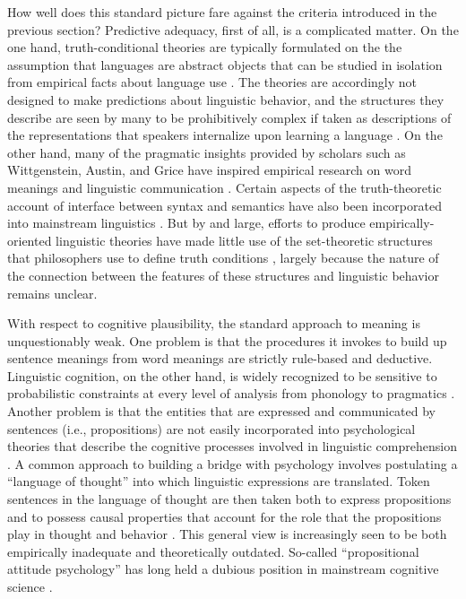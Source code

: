 How well does this standard picture fare against the criteria introduced in the previous section? Predictive adequacy, first of all, is a complicated matter. On the one hand, truth-conditional theories are typically formulated on the the assumption that languages are abstract objects that can be studied in isolation from empirical facts about language use \citep{Lewis:1970, Jackendoff:2002, Speaks:2014}. The theories are accordingly not designed to make predictions about linguistic behavior, and the structures they describe are seen by many to be prohibitively complex if taken as descriptions of the representations that speakers internalize upon learning a language \citep{LiangPotts:2015}. On the other hand, many of the pragmatic insights provided by scholars such as Wittgenstein, Austin, and Grice have inspired empirical research on word meanings and linguistic communication \citep{Pinker:1994,Bloom:2001,Harley:2014}. Certain aspects of the truth-theoretic account of interface between syntax and semantics have also been incorporated into mainstream linguistics \citep{SmolenskyLegendre:2006}. But by and large, efforts to produce empirically-oriented linguistic theories have made little use of the set-theoretic structures that philosophers use to define truth conditions \citep{Jackendoff:2002,Harley:2014}, largely because the nature of the connection between the features of these structures and linguistic behavior remains unclear. 

With respect to cognitive plausibility, the standard approach to meaning is unquestionably weak. One problem is that the procedures it invokes to build up sentence meanings from word meanings are strictly rule-based and deductive. Linguistic cognition, on the other hand, is widely recognized to be sensitive to probabilistic constraints at every level of analysis from phonology to pragmatics  \citep{SmolenskyLegendre:2006,Christiansen:2015,ChaterManning:2006,Seidenberg:1997}. Another problem is that the entities that are expressed and communicated by sentences (i.e., propositions) are not easily incorporated into psychological theories that describe the cognitive processes involved in linguistic comprehension \citep[][Ch. 5]{Dennett:1987}. A common approach to building a bridge with psychology involves postulating a ``language of thought'' into which linguistic expressions are translated. Token sentences in the language of thought are then taken both to express propositions and to possess causal properties that account for the role that the propositions play in thought and behavior \citep{Fodor:1998}. This general view is increasingly seen to be both empirically inadequate and theoretically outdated. So-called ``propositional attitude psychology'' has long held a dubious position in mainstream cognitive science \citep{Dennett:1987,Churchland:1993}.

